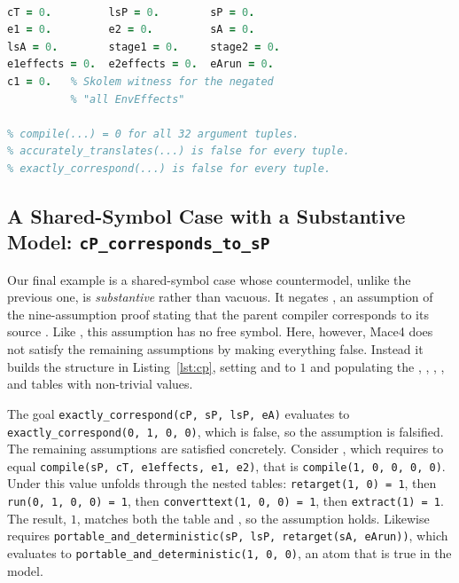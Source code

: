 \begin{lstlisting}[language=Prolog, float=tb, label=lst:ct, caption={Satisfying model for cT-compiles-sP (ddc-independence-2): every constant is $0$, \texttt{compile} is identically $0$, and both relations are false everywhere.}]
% Interpretation of size 2 {0,1}

cT = 0.         lsP = 0.        sP = 0.
e1 = 0.         e2 = 0.         sA = 0.
lsA = 0.        stage1 = 0.     stage2 = 0.
e1effects = 0.  e2effects = 0.  eArun = 0.
c1 = 0.   % Skolem witness for the negated
          % "all EnvEffects"

% compile(...) = 0 for all 32 argument tuples.
% accurately_translates(...) is false for every tuple.
% exactly_correspond(...) is false for every tuple.
\end{lstlisting}

\subsection{A Shared-Symbol Case with a Substantive Model: \texttt{cP\_corresponds\_to\_sP}}

Our final example is a shared-symbol case whose countermodel, unlike the previous one, is \emph{substantive} rather than vacuous. It negates , an assumption of the nine-assumption  proof stating that the parent compiler  corresponds to its source . Like , this assumption has no free symbol. Here, however, Mace4 does not satisfy the remaining assumptions by making everything false. Instead it builds the structure in Listing~\ref{lst:cp}, setting  and  to $1$ and populating the , , , , and  tables with non-trivial values.

The goal \texttt{exactly\_correspond(cP, sP, lsP, eA)} evaluates to \texttt{exactly\_correspond(0, 1, 0, 0)}, which is false, so the assumption is falsified. The remaining assumptions are satisfied concretely. Consider , which requires  to equal \texttt{compile(sP,\allowbreak{} cT,\allowbreak{} e1effects,\allowbreak{} e1,\allowbreak{} e2)}, that is \texttt{compile(1, 0, 0, 0, 0)}. Under  this value unfolds through the nested tables: \texttt{retarget(1, 0) = 1}, then \texttt{run(0, 1, 0, 0) = 1}, then \texttt{converttext(1, 0, 0) = 1}, then \texttt{extract(1) = 1}. The result, $1$, matches both the  table and , so the assumption holds. Likewise  requires \texttt{portable\_and\_deterministic(sP,\allowbreak{} lsP,\allowbreak{} retarget(sA, eArun))}, which evaluates to \texttt{portable\_and\_deterministic(1, 0, 0)}, an atom that is true in the model.

